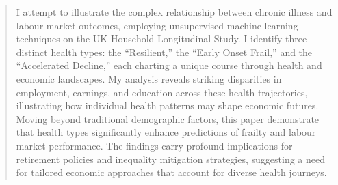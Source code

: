 \begin{abstract}
I attempt to illustrate the complex relationship between chronic illness and labour market outcomes, employing unsupervised machine learning techniques on the UK Household Longitudinal Study. I identify three distinct health types: the ``Resilient,'' the ``Early Onset Frail,'' and the ``Accelerated Decline,'' each charting a unique course through health and economic landscapes. My analysis reveals striking disparities in employment, earnings, and education across these health trajectories, illustrating how individual health patterns may shape economic futures. Moving beyond traditional demographic factors, this paper demonstrate that health types significantly enhance predictions of frailty and labour market performance. The findings carry profound implications for retirement policies and inequality mitigation strategies, suggesting a need for tailored economic approaches that account for diverse health journeys.
\end{abstract}
